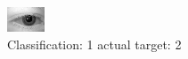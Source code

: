\begin{figure}[h!]
\begin{center}
\includegraphics[width=0.60\columnwidth]{figures/ID465_class_1_target_2.png}
\end{center}
\caption{ Classification: 1 actual target: 2}
\label{fig:ID465_class_1_target_2}
\end{figure}
